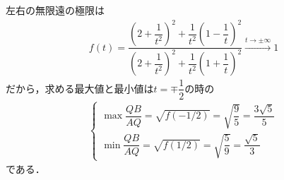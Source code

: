 \documentclass[../../main.tex]{subfiles}
\begin{document}
左右の無限遠の極限は
\begin{align}
  f(t) = \dfrac{\left(2 + \dfrac{1}{t^2}\right)^2 + \dfrac{1}{t^2} \left(1 - \dfrac{1}{t}\right)^2}{\left(2 + \dfrac{1}{t^2}\right)^2 + \dfrac{1}{t^2} \left(1 + \dfrac{1}{t}\right)^2} \xrightarrow{t\to\pm \infty} 1
\end{align}
だから，求める最大値と最小値は$t=\mp\dfrac{1}{2}$の時の
\begin{align}
  \begin{cases}
    \max \dfrac{QB}{AQ} = \sqrt{f(-1/2)} = \sqrt{\dfrac{9}{5}} = \dfrac{3\sqrt{5}}{5} \\
    \min \dfrac{QB}{AQ} = \sqrt{f(1/2)} = \sqrt{\dfrac{5}{9}} = \dfrac{\sqrt{5}}{3}
  \end{cases}
\end{align}
である．
\end{document}
